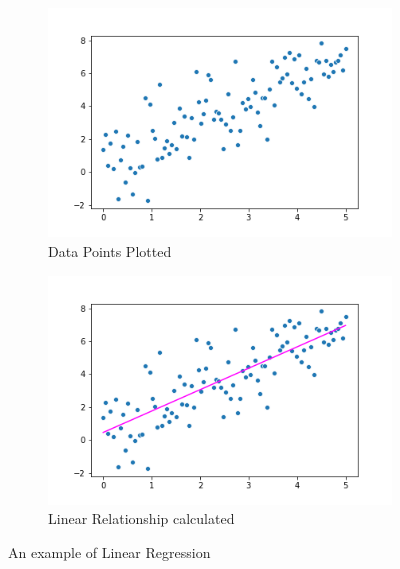 \documentclass[a4paper,11pt,twoside]{article}
\begin{document}
\begin{figure} [h!]
  \centering
  \begin{subfigure}[b]{0.4\textwidth}
    \includegraphics[width=\textwidth]{scatterplt_ex.png}
    \caption{Data Points Plotted}
    \label{fig:1}
  \end{subfigure}
  \begin{subfigure}[b]{0.4\textwidth}
    \includegraphics[width=\textwidth]{linregscatterplt.png}
    \caption{Linear Relationship calculated}
    \label{fig:2}
  \end{subfigure}
  \caption{An example of Linear Regression}
  \label{fig:3}
\end{figure}
\end{document}

